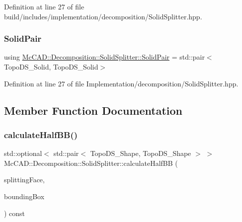 Definition at line 27 of file build/includes/implementation/decomposition/\+Solid\+Splitter.\+hpp.

\mbox{\label{classMcCAD_1_1Decomposition_1_1SolidSplitter_a89a95e43f161348b456a72c9acce0826}} 
\subsubsection{\texorpdfstring{Solid\+Pair}{SolidPair}\hspace{0.1cm}{\footnotesize\ttfamily [2/2]}}
{\footnotesize\ttfamily using \hyperlink{classMcCAD_1_1Decomposition_1_1SolidSplitter_a89a95e43f161348b456a72c9acce0826}{Mc\+C\+A\+D\+::\+Decomposition\+::\+Solid\+Splitter\+::\+Solid\+Pair} =  std\+::pair$<$Topo\+D\+S\+\_\+\+Solid, Topo\+D\+S\+\_\+\+Solid$>$\hspace{0.3cm}{\ttfamily [private]}}



Definition at line 27 of file Implementation/decomposition/\+Solid\+Splitter.\+hpp.



\subsection{Member Function Documentation}
\mbox{\label{classMcCAD_1_1Decomposition_1_1SolidSplitter_a39e64be00e1eb2c6d2149c2b7d6cc85b}} 
\subsubsection{\texorpdfstring{calculate\+Half\+B\+B()}{calculateHalfBB()}\hspace{0.1cm}{\footnotesize\ttfamily [1/2]}}
{\footnotesize\ttfamily std\+::optional$<$ std\+::pair$<$ Topo\+D\+S\+\_\+\+Shape, Topo\+D\+S\+\_\+\+Shape $>$ $>$ Mc\+C\+A\+D\+::\+Decomposition\+::\+Solid\+Splitter\+::calculate\+Half\+BB (\begin{DoxyParamCaption}\item[{const Topo\+D\+S\+\_\+\+Face \&}]{splitting\+Face,  }\item[{const Topo\+D\+S\+\_\+\+Shape \&}]{bounding\+Box }\end{DoxyParamCaption}) const\hspace{0.3cm}{\ttfamily [private]}}



